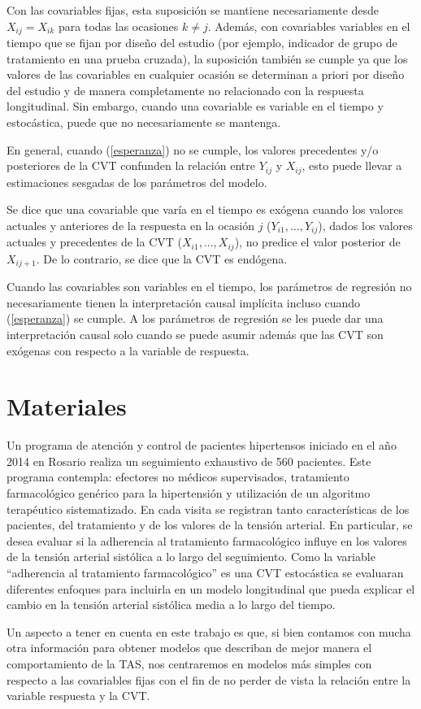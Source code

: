 \documentclass[12pt]{article}
\def\npatients{560}
\def\fullcovname{adherencia al tratamiento farmacológico}
\def\cvt{covariable que varía en el tiempo}
\def\xseqj{$X_{i1}, ..., X_{ij}$}
\def\yseqj{$Y_{i1}, ..., Y_{ij}$}
\begin{document}
Con las covariables fijas, esta suposición se mantiene necesariamente desde $X_{ij} = X_{ik}$ para todas las ocasiones
$k \neq j$. Además, con covariables variables en el tiempo que se fijan por diseño del estudio (por ejemplo, indicador
de grupo de tratamiento en una prueba cruzada), la suposición también se cumple ya que los valores de las covariables
en cualquier ocasión se determinan a priori por diseño del estudio y de manera completamente no relacionado con la
respuesta longitudinal. Sin embargo, cuando una covariable es variable en el tiempo y estocástica, puede que no
necesariamente se mantenga.

En general, cuando (\ref{esperanza}) no se cumple, los valores precedentes y/o posteriores de la CVT confunden la
relación entre $Y_{ij}$ y $X_{ij}$, esto puede llevar a estimaciones sesgadas de los parámetros del modelo.

Se dice que una \cvt{} es exógena cuando los valores actuales y anteriores de la respuesta en la ocasión
$j$ (\yseqj{}), dados los valores actuales y precedentes de la CVT (\xseqj{}), no predice el valor
posterior de $X_{ij+1}$. De lo contrario, se dice que la CVT es endógena.

Cuando las covariables son variables en el tiempo, los parámetros de regresión no
necesariamente tienen la interpretación causal implícita incluso cuando (\ref{esperanza}) se cumple. A los parámetros de
regresión se les puede dar una interpretación causal solo cuando se puede asumir además que las CVT son exógenas con
respecto a la variable de respuesta.

\newpage
\section{Materiales}

Un programa de atención y control de pacientes hipertensos iniciado en el año 2014 en Rosario realiza un seguimiento
exhaustivo de \npatients{} pacientes. Este programa contempla: efectores no médicos supervisados, tratamiento farmacológico
genérico para la hipertensión y utilización de un algoritmo terapéutico sistematizado. En cada visita se registran tanto
características de los pacientes, del tratamiento y de los valores de la tensión arterial. En particular, se desea evaluar
si la adherencia al tratamiento farmacológico influye en los valores de la tensión arterial sistólica a lo largo del
seguimiento. Como la variable “\fullcovname{}” es una CVT estocástica se evaluaran diferentes enfoques para incluirla en un
modelo longitudinal que pueda explicar el cambio en la tensión arterial sistólica media a lo largo del tiempo.

Un aspecto a tener en cuenta en este trabajo es que, si bien contamos con mucha otra información para
obtener modelos que describan de mejor manera el comportamiento de la TAS, nos centraremos en modelos más simples con
respecto a las covariables fijas con el fin de no perder de vista la relación entre la variable respuesta y la CVT.

\newpage
\nocite{*}

\end{document}
